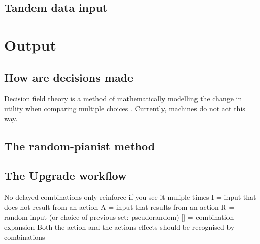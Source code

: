 \documentclass{book}
\begin{document}
\section{Tandem data input}

\chapter{Output}
\section{How are decisions made}
Decision field theory is a method of mathematically modelling the change in utility when comparing multiple choices \cite{busemeyer2002survey}.
Currently, machines do not act this way.

\section{The random-pianist method}

\section{The Upgrade workflow}
No delayed combinations
only reinforce if you see it muliple times
I = input that does not result from an action
A = input that results from an action
R = random input (or choice of previous set: pseudorandom)
[] = combination expansion
Both the action and the actions effects should be recognised by combinations
\end{document}
